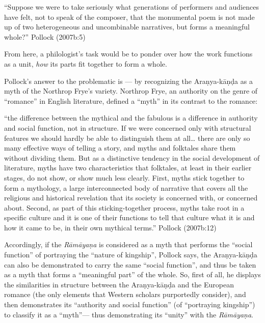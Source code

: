 \begin{myquote}
“Suppose we were to take seriously what generations of performers and audiences have felt, not to speak of the composer, that the monumental poem is not made up of two heterogeneous and uncombinable narratives, but forms a meaningful whole?”
\hfill Pollock (2007b:5)
\end{myquote}

From here, a philologist’s task would be to ponder over how the work functions as a unit, {\sl how} its parts fit together to form a whole. 

Pollock’s answer to the problematic is --- by recognizing the Araṇya-kāṇḍa as a myth of the Northrop Frye’s variety. Northrop Frye, an authority on the genre of “romance” in English literature, defined a “myth” in its contrast to the romance:   

\begin{myquote}
“the difference between the mythical and the fabulous is a difference in authority and social function, not in structure. If we were concerned only with structural features we should hardly be able to distinguish them at all… there are only so many effective ways of telling a story, and myths and folktales share them without dividing them. But as a distinctive tendency in the social development of literature, myths have two characteristics that folktales, at least in their earlier stages, do not show, or show much less clearly. First, myths stick together to form a mythology, a large interconnected body of narrative that covers all the religious and historical revelation that its society is concerned with, or concerned about. Second, as part of this sticking-together process, myths take root in a specific culture and it is one of their functions to tell that culture what it is and how it came to be, in their own mythical terms.”
\hfill Pollock (2007b:12)
\end{myquote}

Accordingly, if the {\sl Rāmāyaṇa} is considered as a myth that performs the “social function” of portraying the “nature of kingship”, Pollock says, the Araṇya-kāṇḍa can also be demonstrated to carry the same “social function”, and thus be taken as a myth that forms a “meaningful part” of the whole. So, first of all, he displays the similarities in structure between the Araṇya-kāṇḍa and the European romance (the only elements that Western scholars purportedly consider), and then demonstrates its “authority and social function” (of “portraying kingship”) to classify it as a “myth”--- thus demonstrating its “unity” with the {\sl Rāmāyaṇa}.


